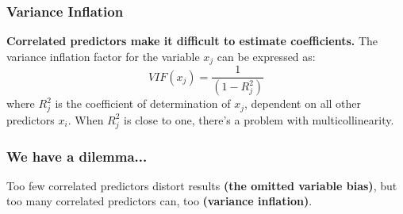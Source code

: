 \documentclass{beamer}
\newenvironment{VerbatimIN}
 {\VerbatimEnvironment
  \begin{tcolorbox}[
    breakable,
    colback=lightgray,
    spartan
  ]%
  \begin{Verbatim}}
 {\end{Verbatim}\end{tcolorbox}}
\newenvironment{VerbatimOUT}
 {\VerbatimEnvironment
  \begin{tcolorbox}[
    breakable,
    spartan
  ]%
  \begin{Verbatim}}
 {\end{Verbatim}\end{tcolorbox}}
\begin{document}

\begin{frame}
  \frametitle{Variance Inflation}
  \textbf{Correlated predictors make it difficult to estimate coefficients.} The variance inflation factor for the variable $x_j$ can be expressed as:
  \begin{equation*}
    VIF(x_j) = \frac{1}{(1-R_j^2)}
  \end{equation*}
  where $R_j^2$ is the coefficient of determination of $x_j$, dependent on all other predictors $x_i$. When $R_j^2$ is close to one, there's a problem with multicollinearity.
\end{frame}


\begin{frame}
    \frametitle{We have a dilemma...}
    \large{Too few correlated predictors distort results \textbf{(the omitted variable bias)}, but too many correlated predictors can, too \textbf{(variance inflation)}.}
\end{frame}
\end{document}
